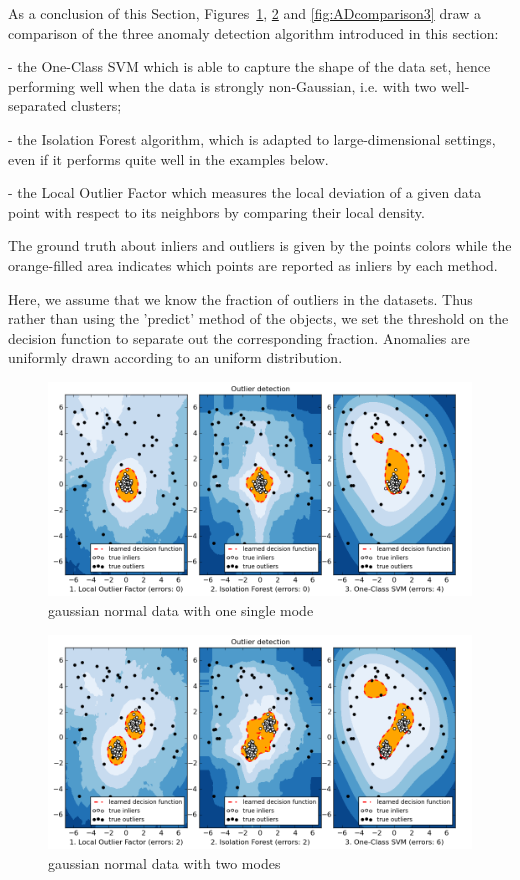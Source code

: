 As a conclusion of this Section,
Figures~\ref{fig:ADcomparison1}, \ref{fig:ADcomparison2} and \ref{fig:ADcomparison3} draw a comparison of the three anomaly detection algorithm introduced in this section:

- the One-Class SVM which is able to capture the shape of the
  data set, hence performing well when the data is strongly
  non-Gaussian, i.e. with two well-separated clusters;

- the Isolation Forest algorithm, which is adapted to
  large-dimensional settings, even if it performs quite well in the
  examples below.

- the Local Outlier Factor which measures the local deviation of a given
  data point with respect to its neighbors by comparing their local density.

The ground truth about inliers and outliers is given by the points colors
while the orange-filled area indicates which points are reported as inliers
by each method.

Here, we assume that we know the fraction of outliers in the datasets.
Thus rather than using the 'predict' method of the objects, we set the
threshold on the decision function to separate out the corresponding
fraction. Anomalies are uniformly drawn according to an uniform distribution.


\begin{figure}[H]
  \centering
  \includegraphics[width=.9\linewidth]{fig_source/ADcomparison1}
  \caption{gaussian normal data with one single mode}
  \label{fig:ADcomparison1}
\end{figure}

\begin{figure}[H]
  \centering
  \includegraphics[width=.9\linewidth]{fig_source/ADcomparison2}
  \caption{gaussian normal data with two modes}
  \label{fig:ADcomparison2}
\end{figure}


